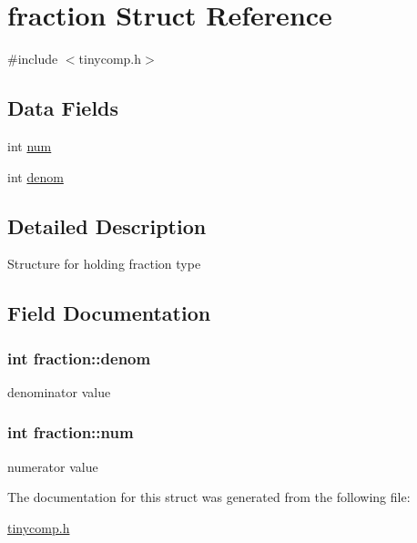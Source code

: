 \hypertarget{structfraction}{}\section{fraction Struct Reference}
\label{structfraction}


{\ttfamily \#include $<$tinycomp.\+h$>$}

\subsection*{Data Fields}
\begin{DoxyCompactItemize}
\item 
int \hyperlink{structfraction_a7700ec3a4dbbd05ba26e243fe5583a85}{num}
\item 
int \hyperlink{structfraction_ae34d45953c8a4d73737d223de22e18c3}{denom}
\end{DoxyCompactItemize}


\subsection{Detailed Description}
Structure for holding fraction type 

\subsection{Field Documentation}
\subsubsection[{\texorpdfstring{denom}{denom}}]{\setlength{\rightskip}{0pt plus 5cm}int fraction\+::denom}\hypertarget{structfraction_ae34d45953c8a4d73737d223de22e18c3}{}\label{structfraction_ae34d45953c8a4d73737d223de22e18c3}
denominator value 
\subsubsection[{\texorpdfstring{num}{num}}]{\setlength{\rightskip}{0pt plus 5cm}int fraction\+::num}\hypertarget{structfraction_a7700ec3a4dbbd05ba26e243fe5583a85}{}\label{structfraction_a7700ec3a4dbbd05ba26e243fe5583a85}
numerator value 

The documentation for this struct was generated from the following file\+:\begin{DoxyCompactItemize}
\item 
\hyperlink{tinycomp_8h}{tinycomp.\+h}\end{DoxyCompactItemize}
